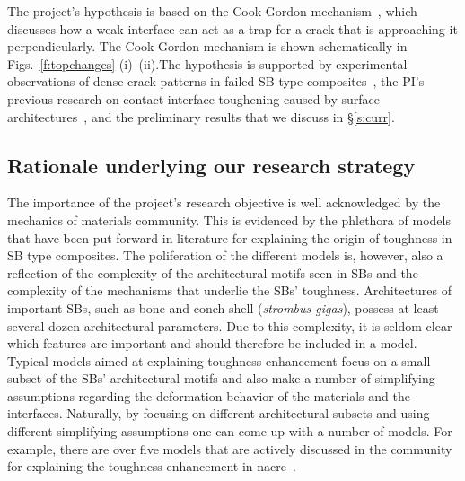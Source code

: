 \documentclass[10pt,letterpaper]{article}
\begin{document}
  The project's hypothesis  is based  on the Cook-Gordon mechanism~\cite{cook1964mechanism}, which discusses how a weak interface can act as a trap for a crack  that is approaching it perpendicularly.   The Cook-Gordon mechanism is shown schematically  in Figs.~\ref{f:topchanges} (i)--(ii).The  hypothesis  is supported by  experimental observations of dense crack patterns in failed SB type composites~\cite{barthelat2007experimental,poissant2010novel}, the PI's previous research on contact interface toughening caused by surface architectures~\cite{kesari2010role,kesari2011mechanics}, and the   preliminary results that we discuss in \S \ref{s:curr}.%

\subsection{Rationale underlying our research strategy}
The importance of the project's research objective is well acknowledged by the mechanics of materials community. This is evidenced by the phlethora of  models that have been put forward in literature for explaining the origin  of toughness in SB type composites. The  poliferation of the different models is, however, also a reflection of the complexity of the architectural motifs seen in  SBs and the complexity of the mechanisms that underlie  the SBs' toughness. Architectures of important SBs, such as bone and conch shell (\textit{strombus gigas}), possess at least several dozen architectural parameters. Due to this complexity, it is seldom clear which features are important and should therefore be included in a model. Typical models aimed at explaining toughness enhancement focus on a small subset of the SBs' architectural motifs and also make a number of simplifying assumptions regarding the deformation behavior of the materials and the interfaces. Naturally, by focusing on different architectural subsets and using different simplifying assumptions one can come up with a number of models. For example, there are over five models that are actively discussed in the community for explaining the toughness enhancement in nacre~\cite{barthelat2007mechanics,smith1999molecular,meyers2008mechanical,li2004nanoscale,lin2006mechanical,chen2013bio}.%
\end{document}
